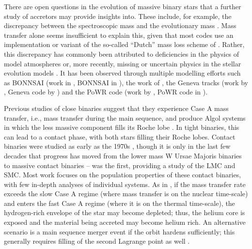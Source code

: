There are open questions in the evolution of massive binary stars that a further study of accretors may provide insights into. These include, for example, the discrepancy between the spectroscopic mass and the evolutionary mass \citep[see, for example,][]{Herrero:1992, Massey:2009, Bouret:2013, Massey:2013, McEvoy:2015, Markova:2018, Ramachandran:2018, Bestenlehner:2020}. Mass transfer alone seems insufficient to explain this, given that most codes use an implementation or variant of the so-called ``Dutch'' mass loss scheme of \citet{De_jager:1988, Vink:2001}. Rather, this discrepancy has commonly been attributed to deficiencies in the physics of model atmospheres \citep{Herrero:1992} or, more recently, missing or uncertain physics in the stellar evolution models \citep{Bestenlehner:2020}. It has been observed through multiple modelling efforts such as BONNSAI (work in \citealt{Bestenlehner:2020}, BONNSAI in \citealt{Schneider:2014}), the work of \citet{Maeder:1990} \citep{Herrero:1992}, the Geneva tracks (work by \citealt{Markova:2018}, Geneva code by \citealt{Ekstrom:2012}) and the PoWR code (work by \citealt{Ramachandran:2018}, PoWR code in \citealt{Grafener:2002, Hamann:2003, Sander:2015}).

Previous studies of close binaries suggest that they experience Case A mass transfer, i.e., mass transfer during the main sequence, and produce Algol systems in which the less massive component fills its Roche lobe \citep[e.g.][]{Leung:1989, Pols:1994, Vanbeveren:1998, Wellstein:2001, deMink:2007, Sen:2022}. In tight binaries, this can lead to a contact phase, with both stars filling their Roche lobes. Contact binaries were studied as early as the 1970s \citep{Robertson:1977}, though it is only in the last few decades that progress has moved from the lower mass W Ursae Majoris binaries to massive contact binaries -- \citet{Menon:2011} was the first, providing a study of the LMC and SMC. Most work focuses on the population properties of these contact binaries, with few in-depth analyses of individual systems. As in \citet{Sen:2022}, if the mass transfer rate exceeds the slow Case A regime (where mass transfer is on the nuclear time-scale) and enters the fast Case A regime (where it is on the thermal time-scale), the hydrogen-rich envelope of the star may become depleted; thus, the helium core is exposed and the material being accreted may become helium rich. An alternative scenario is a main sequence merger event if the orbit hardens sufficiently; this generally requires filling of the second Lagrange point as well \citep{Tylenda:2011, Nandez:2014}.  %

